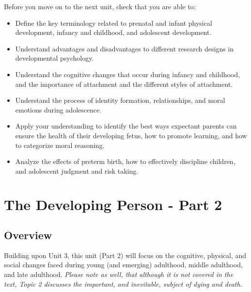 \documentclass[
]{book}
\providecommand{\tightlist}{%
  \setlength{\itemsep}{0pt}\setlength{\parskip}{0pt}}
\begin{document}
\begin{progress}
Before you move on to the next unit, check that you are able to:

\begin{itemize}
\tightlist
\item
  Define the key terminology related to prenatal and infant physical development, infancy and childhood, and adolescent development.\\
\item
  Understand advantages and disadvantages to different research designs in developmental psychology.\\
\item
  Understand the cognitive changes that occur during infancy and childhood, and the importance of attachment and the different styles of attachment.\\
\item
  Understand the process of identity formation, relationships, and moral emotions during adolescence.\\
\item
  Apply your understanding to identify the best ways expectant parents can ensure the health of their developing fetus, how to promote learning, and how to categorize moral reasoning.\\
\item
  Analyze the effects of preterm birth, how to effectively discipline children, and adolescent judgment and risk taking.
\end{itemize}
\end{progress}

\hypertarget{the-developing-person---part-2}{%
\chapter{The Developing Person - Part 2}\label{the-developing-person---part-2}}

\hypertarget{overview-1}{%
\section*{Overview}\label{overview-1}}

Building upon Unit 3, this unit (Part 2) will focus on the cognitive, physical, and social changes faced during young (and emerging) adulthood, middle adulthood, and late adulthood. \emph{Please note as well, that although it is not covered in the text, Topic 2 discusses the important, and inevitable, subject of dying and death.}
\end{document}
